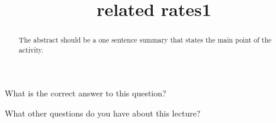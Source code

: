 \documentclass{ximera}
\title{related rates1}
\begin{document}
\begin{abstract}
  The abstract should be a one sentence summary that states the main point of the activity.
\end{abstract}

\maketitle

\begin{question}
  What is the correct answer to this question?

  
    \begin{multipleChoice}
    \end{multipleChoice}  
  
\end{question}

What other questions do you have about this lecture?
\begin{question}
  \begin{freeResponse}
  \end{freeResponse}
\end{question}
\end{document}

